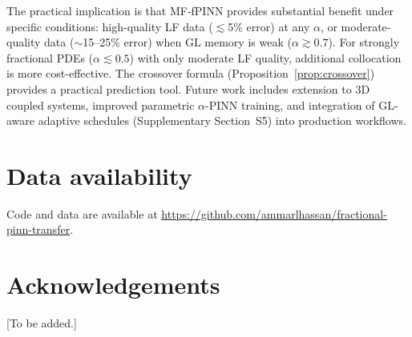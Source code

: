 \documentclass[preprint,12pt]{elsarticle}
\begin{document}
The practical implication is that MF-fPINN provides substantial benefit under specific conditions: high-quality LF data ($\lesssim$5\% error) at any $\alpha$, or moderate-quality data ($\sim$15--25\% error) when GL memory is weak ($\alpha \gtrsim 0.7$). For strongly fractional PDEs ($\alpha \lesssim 0.5$) with only moderate LF quality, additional collocation is more cost-effective. The crossover formula (Proposition~\ref{prop:crossover}) provides a practical prediction tool. Future work includes extension to 3D coupled systems, improved parametric $\alpha$-PINN training, and integration of GL-aware adaptive schedules (Supplementary Section~S5) into production workflows.


\section*{Data availability}

Code and data are available at \url{https://github.com/ammarlhassan/fractional-pinn-transfer}.

\section*{Acknowledgements}

[To be added.]



\end{document}
